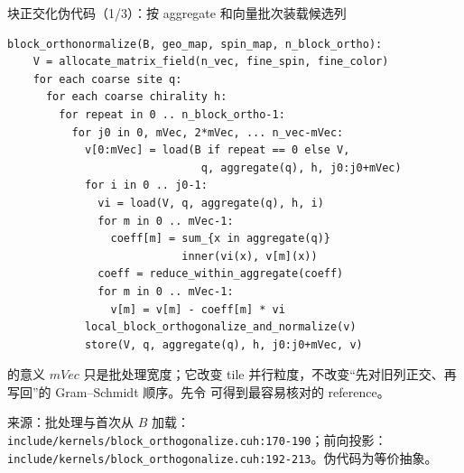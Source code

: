 \documentclass[UTF8,aspectratio=169,11pt]{ctexbeamer}
\newcommand{\source}[1]{\vspace{0.05em}\par{\raggedright\scriptsize\color{muted}来源：#1\par}}
\newcommand{\codepath}[1]{\nolinkurl{#1}}
\begin{document}
\begin{frame}[fragile,t]{块正交化伪代码（1/3）：按 aggregate 和向量批次装载候选列}
  \begin{lstlisting}[firstnumber=1]
block_orthonormalize(B, geo_map, spin_map, n_block_ortho):
    V = allocate_matrix_field(n_vec, fine_spin, fine_color)
    for each coarse site q:
      for each coarse chirality h:
        for repeat in 0 .. n_block_ortho-1:
          for j0 in 0, mVec, 2*mVec, ... n_vec-mVec:
            v[0:mVec] = load(B if repeat == 0 else V,
                              q, aggregate(q), h, j0:j0+mVec)
            for i in 0 .. j0-1:
              vi = load(V, q, aggregate(q), h, i)
              for m in 0 .. mVec-1:
                coeff[m] = sum_{x in aggregate(q)}
                           inner(vi(x), v[m](x))
              coeff = reduce_within_aggregate(coeff)
              for m in 0 .. mVec-1:
                v[m] = v[m] - coeff[m] * vi
            local_block_orthogonalize_and_normalize(v)
            store(V, q, aggregate(q), h, j0:j0+mVec, v)
  \end{lstlisting}
  \vspace{0.08cm}
  \begin{block}{\texttt{} 的意义}
    \(mVec\) 只是批处理宽度；它改变 tile 并行粒度，不改变“先对旧列正交、再写回”的 Gram--Schmidt 顺序。先令 \texttt{} 可得到最容易核对的 reference。
  \end{block}
  \source{批处理与首次从 \(B\) 加载：\codepath{include/kernels/block_orthogonalize.cuh:170-190}；前向投影：\codepath{include/kernels/block_orthogonalize.cuh:192-213}。伪代码为等价抽象。}
\end{frame}
\end{document}
